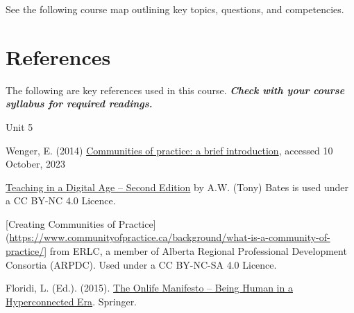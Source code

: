 \documentclass[
]{book}
\theoremstyle{definition}
\theoremstyle{definition}
\theoremstyle{definition}
\theoremstyle{definition}
\theoremstyle{remark}
\begin{document}
See the following course map outlining key topics, questions, and competencies.

\hypertarget{references}{%
\chapter*{References}\label{references}}

The following are key references used in this course. \textbf{\emph{Check with your course syllabus for required readings.}}

Unit 5

Wenger, E. (2014) \href{https://www.wenger-trayner.com/introduction-to-communities-of-practice/}{Communities of practice: a brief introduction}, accessed 10 October, 2023

\href{https://pressbooks.bccampus.ca/teachinginadigitalagev2/}{Teaching in a Digital Age -- Second Edition} by A.W. (Tony) Bates is used under a CC BY-NC 4.0 Licence.

{[}Creating Communities of Practice{]}(\url{https://www.communityofpractice.ca/background/what-is-a-community-of-practice/}{]} from ERLC, a member of Alberta Regional Professional Development Consortia (ARPDC). Used under a CC BY-NC-SA 4.0 Licence.

Floridi, L. (Ed.). (2015). \href{https://link.springer.com/book/10.1007/978-3-319-04093-6}{The Onlife Manifesto -- Being Human in a Hyperconnected Era}. Springer.

  
\end{document}
